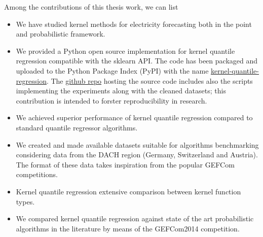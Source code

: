 Among the contributions of this thesis work, we can list
\begin{itemize}
    \item We have studied kernel methods for electricity forecasting both in the point and probabilistic framework.
    \item We provided a Python open source implementation for kernel quantile regression compatible with the sklearn API. The code has been packaged and uploaded to the Python Package Index (PyPI) with the name \href{https://pypi.org/project/kernel-quantile-regression/#2}{kernel-quantile-regression}. The \href{https://github.com/luca-pernigo/ThesisKernelMethods}{github repo} hosting the source code includes also the scripts implementing the experiments along with the cleaned datasets; this contribution is intended to forster reproducibility in research.
    \item We achieved superior performance of kernel quantile regression compared to standard quantile regressor algorithms. 
    \item We created and made available datasets suitable for algorithms benchmarking considering data from the DACH region (Germany, Switzerland and Austria). The format of these data takes inspiration from the popular GEFCom competitions.
    \item Kernel quantile regression extensive comparison between kernel function types.
    \item We compared kernel quantile regression against state of the art probabilistic algorithms in the literature by means of the GEFCom2014 competition.
\end{itemize}



